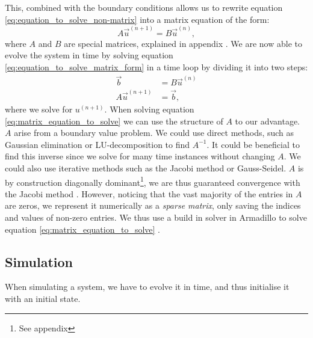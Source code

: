         This, combined with the boundary conditions allows us to rewrite equation \eqref{eq:equation_to_solve_non-matrix} into a matrix equation of the form:
        \begin{equation}\label{eq:equation_to_solve_matrix_form}
            A\vec{u}^{(n+1)} = B\vec{u}^{(n)},
        \end{equation}
        where $A$ and $B$ are special matrices, explained in appendix . 
        We are now able to evolve the system in time by solving equation \eqref{eq:equation_to_solve_matrix_form} in a time loop by dividing it into two steps:
        \begin{equation}\label{eq:matrix_equation_to_solve}
            \begin{split}
                \vec{b} &= B\vec{u}^{(n)} \\
                A\vec{u}^{(n+1)} &= \vec{b},
            \end{split}
        \end{equation}
        where we solve for $u^{(n+1)}$. When solving equation \eqref{eq:matrix_equation_to_solve} we can use the structure of $A$ to our advantage. $A$ arise from a boundary value problem. We could use direct methods, such as Gaussian elimination or LU-decomposition to find $A^{-1}$. It could be beneficial to find this inverse since we solve for many time instances without changing $A$. We could also use iterative methods such as the Jacobi method or Gauss-Seidel. $A$ is by construction diagonally dominant\footnote{See appendix }, we are thus guaranteed convergence with the Jacobi method . However, noticing that the vast majority of the entries in $A$ are zeros, we represent it numerically as a \textit{sparse matrix}, only saving the indices and values of non-zero entries. We thus use a build in solver in Armadillo to solve equation \eqref{eq:matrix_equation_to_solve} \citep{lecture_notes}.
        
\subsection{Simulation}
    When simulating a system, we have to evolve it in time, and thus initialise it with an initial state.
